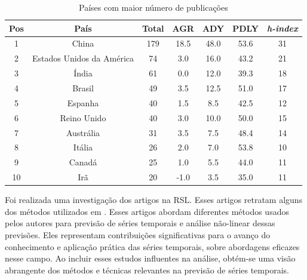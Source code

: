 \begin{table}[tb]
	\centering
	\caption{Países com maior número de publicações}\label{tb:pais}
	\begin{tabular}{ccccccc}
		\toprule
		Pos & País & Total & AGR & ADY & PDLY & \textit{h-index} \\
		\midrule
		1 & China & 179 & 18.5 & 48.0 & 53.6 & 31 \\
		2 & Estados Unidos da América & 74 & 3.0 & 16.0 & 43.2 & 21 \\
		3 & Índia & 61 & 0.0 & 12.0 & 39.3 & 18 \\
		4 & Brasil & 49 & 3.5 & 12.5 & 51.0 & 17 \\
		5 & Espanha & 40 & 1.5 & 8.5 & 42.5 & 12 \\
		6 & Reino Unido & 40 & 3.0 & 10.0 & 50.0 & 15 \\
		7 & Austrália & 31 & 3.5 & 7.5 & 48.4 & 14 \\
		8 & Itália & 26 & 2.0 & 7.0 & 53.8 & 10 \\
		9 & Canadá & 25 & 1.0 & 5.5 & 44.0 & 11 \\
		10 & Irã & 20 & -1.0 & 3.5 & 35.0 & 11 \\
		\bottomrule
	\end{tabular}
	
	
\end{table}



Foi realizada uma investigação dos artigos na RSL. Esses artigos retratam alguns dos métodos utilizados em 
.
Esses artigos abordam diferentes métodos usados pelos autores para previsão de séries temporais e análise não-linear dessas previsões. Eles representam contribuições significativas para o avanço do conhecimento e aplicação prática das séries temporais, sobre abordagens eficazes nesse campo. Ao incluir esses estudos influentes na análise, obtém-se uma visão abrangente dos métodos e técnicas  relevantes na previsão de séries temporais.

